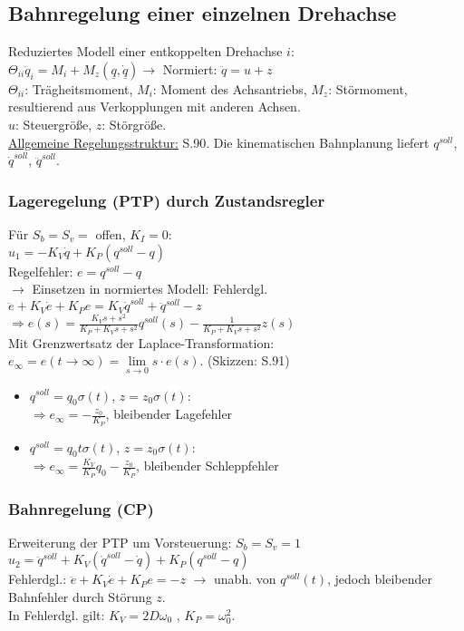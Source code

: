 \documentclass[a4paper,landscape,6pt]{article}
\newcommand{\ul}[1]{\underline{#1}}
\begin{document}
\begin{multicols}{3}
\subsection*{Bahnregelung einer einzelnen Drehachse}
Reduziertes Modell einer entkoppelten Drehachse $i$:\\ $\Theta_{ii} \ddot { q}_i = M_i + M_z(\ul q, \dot{\ul q})$\tab  $\rightarrow$ Normiert: $\boxed{\ddot q = u + z}$\\

$\Theta_{ii}$: Trägheitsmoment, $M_i$: Moment des Achsantriebs, $M_z$: Störmoment, resultierend aus Verkopplungen mit anderen Achsen. \\

$u$: Steuergröße, $z$: Störgröße.\\
\ul{Allgemeine Regelungsstruktur:} S.90. Die kinematischen Bahnplanung liefert $q^{soll}$, $\dot q^{soll}$, $\ddot q^{soll}$.
\subsubsection*{Lageregelung (PTP) durch Zustandsregler}
Für $S_b=S_v=$ offen, $K_I=0$:\\ $\boxed{u_1 = -K_V \dot q + K_P (q^{soll} - q)}$ \\
Regelfehler: $\boxed{e = q^{soll} - q}$\\

$\rightarrow$ Einsetzen in normiertes Modell: Fehlerdgl.\\
$\ddot e + K_V \dot e + K_P e = K_V \dot q^{soll} + \ddot q^{soll} - z$\\
$\Rightarrow e(s) = \frac{K_V s + s^2}{K_P + K_V s + s^2} q^{soll}(s) - \frac{1}{K_P + K_V s + s^2} z(s)$\\

Mit Grenzwertsatz der Laplace-Transformation:\\
$e_\infty = e(t\rightarrow \infty) = \lim\limits_{s \rightarrow 0}s\cdot e(s)$. (Skizzen: S.91)
\begin{itemize}
	\item $q^{soll}=q_0 \sigma(t)$, $z = z_0 \sigma(t)$:\\
	$\Rightarrow e_\infty = -\frac{z_0}{K_P}$, bleibender Lagefehler
	\item $q^{soll}=q_0 t \sigma(t)$, $z = z_0 \sigma(t)$:\\
	 $\Rightarrow e_\infty = \frac{K_V}{K_P}q_0 -\frac{z_0}{K_P}$, bleibender Schleppfehler
\end{itemize}
\subsubsection*{Bahnregelung (CP)}
Erweiterung der PTP um Vorsteuerung: $S_b=S_v=1$ \\
$\boxed{u_2 = \ddot q^{soll} + K_V (\dot q^{soll} - \dot q) + K_P (q^{soll} - q)}$\\
Fehlerdgl.: $\ddot e + K_V \dot e + K_P e = - z$ $\rightarrow$ unabh. von $q^{soll}(t)$, jedoch bleibender Bahnfehler durch Störung $z$.\\ In Fehlerdgl. gilt: $K_V = 2D\omega_0$ , $K_P = \omega_0^2$.

\end{multicols}
\end{document}

